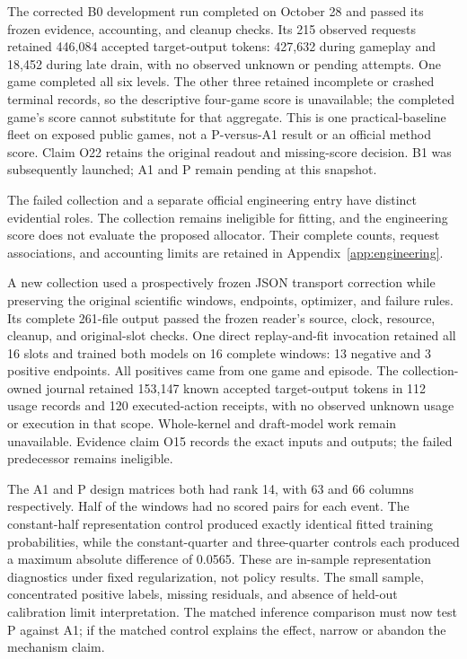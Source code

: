 \documentclass[11pt]{article}
\begin{document}
The corrected B0 development run completed on October 28 and passed its frozen evidence, accounting, and cleanup checks. Its 215 observed requests retained 446,084 accepted target-output tokens: 427,632 during gameplay and 18,452 during late drain, with no observed unknown or pending attempts. One game completed all six levels. The other three retained incomplete or crashed terminal records, so the descriptive four-game score is unavailable; the completed game's score cannot substitute for that aggregate. This is one practical-baseline fleet on exposed public games, not a P-versus-A1 result or an official method score. Claim O22 retains the original readout and missing-score decision. B1 was subsequently launched; A1 and P remain pending at this snapshot.

The failed collection and a separate official engineering entry have distinct evidential roles. The collection remains ineligible for fitting, and the engineering score does not evaluate the proposed allocator. Their complete counts, request associations, and accounting limits are retained in Appendix~\ref{app:engineering}.

A new collection used a prospectively frozen JSON transport correction while preserving the original scientific windows, endpoints, optimizer, and failure rules. Its complete 261-file output passed the frozen reader's source, clock, resource, cleanup, and original-slot checks. One direct replay-and-fit invocation retained all 16 slots and trained both models on 16 complete windows: 13 negative and 3 positive endpoints. All positives came from one game and episode. The collection-owned journal retained 153,147 known accepted target-output tokens in 112 usage records and 120 executed-action receipts, with no observed unknown usage or execution in that scope. Whole-kernel and draft-model work remain unavailable. Evidence claim O15 records the exact inputs and outputs; the failed predecessor remains ineligible.

The A1 and P design matrices both had rank 14, with 63 and 66 columns respectively. Half of the windows had no scored pairs for each event. The constant-half representation control produced exactly identical fitted training probabilities, while the constant-quarter and three-quarter controls each produced a maximum absolute difference of 0.0565. These are in-sample representation diagnostics under fixed regularization, not policy results. The small sample, concentrated positive labels, missing residuals, and absence of held-out calibration limit interpretation. The matched inference comparison must now test P against A1; if the matched control explains the effect, narrow or abandon the mechanism claim.
\end{document}

